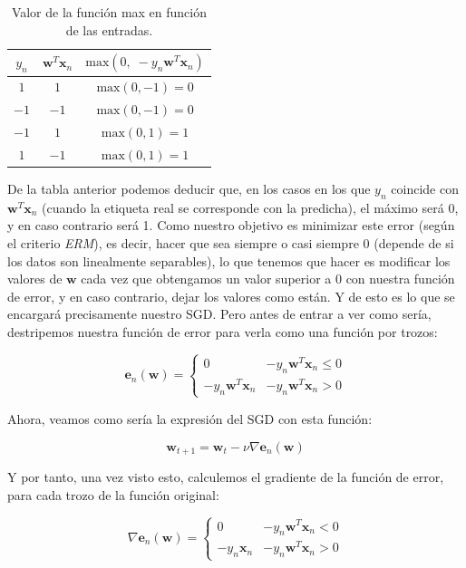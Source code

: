 \documentclass[11pt,a4paper]{article}
\newcommand{\maximum}{\text{max}}
\begin{document}
\begin{table}[H]
\centering
\begin{tabular}{c|c|c}
	$y_n$ & $\mathbf{w}^T\mathbf{x}_n$ & $\maximum(0, \; -y_n\mathbf{w}^T\mathbf{x}_n)$ \\ \hline
	$1$  & $1$		   & $\maximum(0, -1) = 0$ \\
	$-1$ & $-1$        & $\maximum(0, -1) = 0$  \\
	$-1$ & $1$         & $\maximum(0, 1) = 1$   \\
	$1$  & $-1$        & $\maximum(0, 1) = 1$                  
\end{tabular}
\caption{Valor de la función max en función de las entradas.}
\end{table}

De la tabla anterior podemos deducir que, en los casos en los que $y_n$ coincide con $\mathbf{w}^T\mathbf{x}_n$ (cuando la
etiqueta real se corresponde con la predicha), el máximo será 0, y en caso contrario será 1. Como nuestro objetivo es
minimizar este error (según el criterio \textit{ERM}), es decir, hacer que sea siempre o casi siempre 0 (depende de si los
datos son linealmente separables), lo que tenemos que hacer es modificar los valores de $\mathbf{w}$ cada vez que obtengamos
un valor superior a 0 con nuestra función de error, y en caso contrario, dejar los valores como están. Y de esto es lo que se
encargará precisamente nuestro SGD. Pero antes de entrar a ver como sería, destripemos nuestra función de error para verla
como una función por trozos:

\begin{equation}
\mathbf{e}_n(\mathbf{w}) = 
\begin{cases}
	0 & -y_n\mathbf{w}^T\mathbf{x}_n \leq 0 \\
	-y_n\mathbf{w}^T\mathbf{x}_n & -y_n\mathbf{w}^T\mathbf{x}_n > 0
\end{cases}
\end{equation}

Ahora, veamos como sería la expresión del SGD con esta función:

\begin{equation}
	\mathbf{w}_{t+1} = \mathbf{w}_{t} - \nu \nabla \mathbf{e}_n(\mathbf{w})
\end{equation}

Y por tanto, una vez visto esto, calculemos el gradiente de la función de error, para cada trozo de la función original:

\begin{equation}
\nabla \mathbf{e}_n(\mathbf{w}) = 
\begin{cases}
	0 & -y_n\mathbf{w}^T\mathbf{x}_n < 0 \\
	-y_n\mathbf{x}_n & -y_n\mathbf{w}^T\mathbf{x}_n > 0
\end{cases}
\end{equation}
\end{document}
